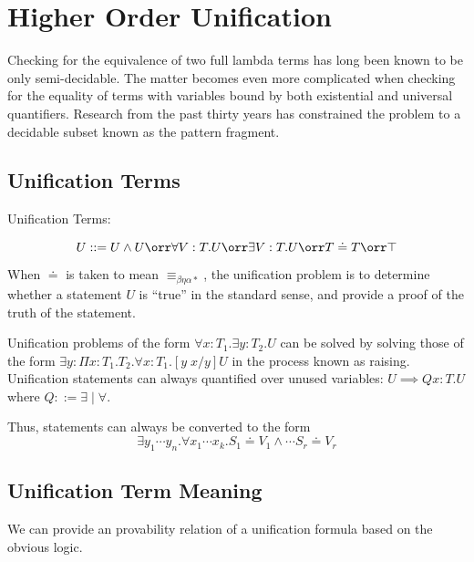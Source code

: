 \section{Higher Order Unification}

Checking for the equivalence of two full lambda terms has long been known to be only semi-decidable.
The matter becomes even more complicated when checking for the equality of terms with variables bound
by both existential and universal quantifiers.  Research from the past thirty years has constrained
the problem to a decidable subset known as the pattern fragment.

\subsection{Unification Terms}

\begin{definition}
Unification Terms:

\[
U ::= U \wedge U 
 \orr \forall V : T . U
 \orr \exists V : T . U 
 \orr T \doteq T
 \orr \top
\]
\label{def:hou:syn}
\end{definition}

When $\doteq$ is taken to mean $\equiv_{\beta\eta\alpha*}$, the unification problem is to determine 
whether a statement $U$ is ``true'' in the standard sense, and provide a proof of the truth of the statement. 

Unification problems of the form 
$\forall x : T_1 . \exists y : T_2 . U $ can be solved by solving those of the form
$\exists y : \Pi x : T_1 . T_2 . \forall x : T_1 . [y\; x / y ]U $ 
in the process known as raising. 
Unification statements can always quantified over unused variables: $U \implies Q x : T . U$ 
where $Q ::= \exists \;|\; \forall $.  

Thus, statements can always be converted to the form
\[
\exists y_1 \cdots y_n . \forall x_1 \cdots x_k . S_1 \doteq V_1 \wedge \cdots S_r \doteq V_r
\]




\subsection{Unification Term Meaning}

We can provide an provability relation of a unification formula
based on the obvious logic.


